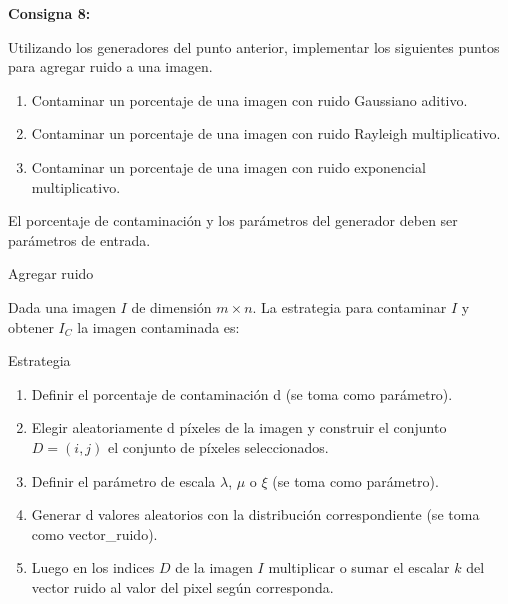 \documentclass{beamer}
\begin{document}
\begin{frame}
	\begin{center}
		\textcolor{unahurverde}{\textbf{Consigna 8:}}
	\end{center}
	\justifying
	
	Utilizando los generadores del punto anterior, implementar los siguientes puntos para agregar ruido a una imagen.
	
	\begin{enumerate}%
		\item Contaminar un porcentaje de una imagen con ruido Gaussiano aditivo.
		\item Contaminar un porcentaje de una imagen con ruido Rayleigh multiplicativo.
		\item Contaminar un porcentaje de una imagen con ruido exponencial multiplicativo.
	\end{enumerate}
	
	\vspace{0.3cm}
	
	El porcentaje de contaminación y los parámetros del generador deben ser parámetros de entrada.
\end{frame}

\begin{frame}[fragile]{Agregar ruido}
	\justifying
	
	Dada una imagen $I$ de dimensión $m \times n$. La estrategia para contaminar $I$ y obtener $I_C$ la imagen contaminada es:
	
	\begin{block}{Estrategia}
		\begin{enumerate}
			\item Definir el porcentaje de contaminación d (se toma como parámetro).
			\item Elegir aleatoriamente d píxeles de la imagen y construir el conjunto $D = (i,j)$ el conjunto de píxeles seleccionados.
			\item Definir el parámetro de escala $\lambda$, $\mu$ o $\xi$ (se toma como parámetro).
			\item Generar d valores aleatorios con la distribución correspondiente (se toma como vector\_ruido).
			\item Luego en los indices $D$ de la imagen $I$ multiplicar o sumar el escalar  $k$ del vector ruido al valor del pixel según corresponda.
		\end{enumerate}
	\end{block}
\end{frame}
\end{document}
